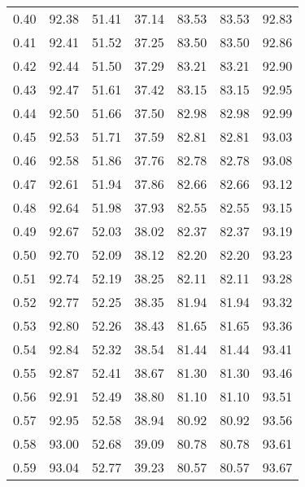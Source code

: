 \begin{tabular}{|c|c|c|c|c|c|c|}
      0.40 &     92.38 &     51.41 &      37.14 &   83.53 &      83.53 &         92.83 \\
      0.41 &     92.41 &     51.52 &      37.25 &   83.50 &      83.50 &         92.86 \\
      0.42 &     92.44 &     51.50 &      37.29 &   83.21 &      83.21 &         92.90 \\
      0.43 &     92.47 &     51.61 &      37.42 &   83.15 &      83.15 &         92.95 \\
      0.44 &     92.50 &     51.66 &      37.50 &   82.98 &      82.98 &         92.99 \\
      0.45 &     92.53 &     51.71 &      37.59 &   82.81 &      82.81 &         93.03 \\
      0.46 &     92.58 &     51.86 &      37.76 &   82.78 &      82.78 &         93.08 \\
      0.47 &     92.61 &     51.94 &      37.86 &   82.66 &      82.66 &         93.12 \\
      0.48 &     92.64 &     51.98 &      37.93 &   82.55 &      82.55 &         93.15 \\
      0.49 &     92.67 &     52.03 &      38.02 &   82.37 &      82.37 &         93.19 \\
      0.50 &     92.70 &     52.09 &      38.12 &   82.20 &      82.20 &         93.23 \\
      0.51 &     92.74 &     52.19 &      38.25 &   82.11 &      82.11 &         93.28 \\
      0.52 &     92.77 &     52.25 &      38.35 &   81.94 &      81.94 &         93.32 \\
      0.53 &     92.80 &     52.26 &      38.43 &   81.65 &      81.65 &         93.36 \\
      0.54 &     92.84 &     52.32 &      38.54 &   81.44 &      81.44 &         93.41 \\
      0.55 &     92.87 &     52.41 &      38.67 &   81.30 &      81.30 &         93.46 \\
      0.56 &     92.91 &     52.49 &      38.80 &   81.10 &      81.10 &         93.51 \\
      0.57 &     92.95 &     52.58 &      38.94 &   80.92 &      80.92 &         93.56 \\
      0.58 &     93.00 &     52.68 &      39.09 &   80.78 &      80.78 &         93.61 \\
      0.59 &     93.04 &     52.77 &      39.23 &   80.57 &      80.57 &         93.67 \\

\end{tabular}
